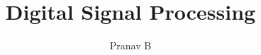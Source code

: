 \documentclass[journal,12pt,twocolumn]{IEEEtran}
\begin{document}

\def\putbox#1#2#3{\makebox[0in][l]{\makebox[#1][l]{}\raisebox{\baselineskip}[0in][0in]{\raisebox{#2}[0in][0in]{#3}}}}
     \def\rightbox#1{\makebox[0in][r]{#1}}
     \def\centbox#1{\makebox[0in]{#1}}
     \def\topbox#1{\raisebox{-\baselineskip}[0in][0in]{#1}}
     \def\midbox#1{\raisebox{-0.5\baselineskip}[0in][0in]{#1}}

\vspace{3cm}

\title{ 
Digital Signal Processing
}


%
%
%

\author{ Pranav B %
}
% 
%
\end{document}
